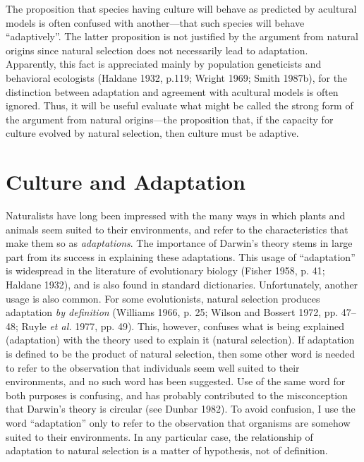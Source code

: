 \documentclass[11pt]{article}
\begin{document}
The proposition that species having culture will behave as predicted by
acultural models is often confused with another---that such species will
behave ``adaptively''.  The latter proposition is not justified by the
argument from natural origins since natural selection does not necessarily
lead to adaptation.  Apparently, this fact is appreciated mainly by
population geneticists and behavioral ecologists (Haldane 1932, p.119;
Wright 1969; Smith 1987b), for the distinction between adaptation and
agreement with acultural models is often ignored.  Thus, it will be useful
evaluate what might be called the strong form of the argument from natural
origins---the proposition that, if the capacity for culture evolved by
natural selection, then culture must be adaptive.

\section{Culture and Adaptation}

Naturalists have long been impressed with the many ways in which plants
and animals seem suited to their environments, and refer to the
characteristics that make them so as \emph{adaptations}.  The importance of
Darwin's theory stems in large part from its success in explaining these
adaptations.  This usage of ``adaptation'' is widespread in the
literature of evolutionary biology (Fisher 1958, p. 41; Haldane 1932),
and is also found in standard dictionaries.  Unfortunately,
another usage is also common.  For some evolutionists, natural
selection produces adaptation \emph{by definition} 
(Williams 1966, p. 25; Wilson and Bossert 1972, pp. 47--48; Ruyle \emph{et
al.} 1977, pp. 49).  This, however, confuses what is being explained
(adaptation) with the theory used to explain it (natural selection).  If
adaptation is defined to be the product of natural selection, then some
other word is needed to refer to the observation that individuals seem
well suited to their environments, and no such word has been suggested.
Use of the same word for both purposes is confusing, and has
probably contributed to the misconception that Darwin's theory is circular
(see Dunbar 1982).  To avoid confusion, I use the word ``adaptation'' only to
refer to the observation that organisms are somehow suited to their
environments.  In any particular case, the relationship of adaptation to
natural selection is a matter of hypothesis, not of definition. 


\end{document}
